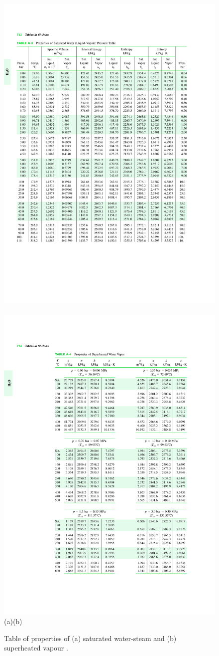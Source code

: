    \begin{figure}[h]
      \vbox{
         \hbox{\includegraphics[width=.5\columnwidth,clip]{./Figs/WaterSatTable}
               \includegraphics[width=.5\columnwidth,clip]{./Figs/Water_SuperheatedTable}}
         \vspace{-1.5cm}
         \hbox{\hspace{4cm}(a)\hspace{7cm}(b)}
      }
      \caption{ Table of properties of (a) saturated water-steam and (b) superheated vapour \citep[Extracted from ][see Appendix~\ref{Appendix:Saturated_SH_Tables}]{Moran_Book}.}\label{Chapter:ThermodynamicPropertiesPureFluids:Fig:Fig03}
   \end{figure}
%
    

